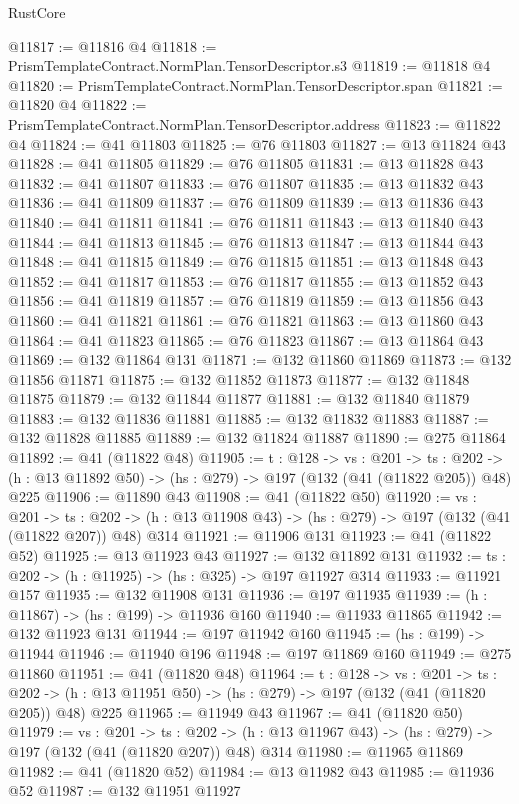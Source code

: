 \begin{lexlean}{RustCore}
\begin{coremodule}
@11817 := @11816 @4
@11818 := PrismTemplateContract.NormPlan.TensorDescriptor.s3
@11819 := @11818 @4
@11820 := PrismTemplateContract.NormPlan.TensorDescriptor.span
@11821 := @11820 @4
@11822 := PrismTemplateContract.NormPlan.TensorDescriptor.address
@11823 := @11822 @4
@11824 := @41 @11803
@11825 := @76 @11803
@11827 := @13 @11824 @43
@11828 := @41 @11805
@11829 := @76 @11805
@11831 := @13 @11828 @43
@11832 := @41 @11807
@11833 := @76 @11807
@11835 := @13 @11832 @43
@11836 := @41 @11809
@11837 := @76 @11809
@11839 := @13 @11836 @43
@11840 := @41 @11811
@11841 := @76 @11811
@11843 := @13 @11840 @43
@11844 := @41 @11813
@11845 := @76 @11813
@11847 := @13 @11844 @43
@11848 := @41 @11815
@11849 := @76 @11815
@11851 := @13 @11848 @43
@11852 := @41 @11817
@11853 := @76 @11817
@11855 := @13 @11852 @43
@11856 := @41 @11819
@11857 := @76 @11819
@11859 := @13 @11856 @43
@11860 := @41 @11821
@11861 := @76 @11821
@11863 := @13 @11860 @43
@11864 := @41 @11823
@11865 := @76 @11823
@11867 := @13 @11864 @43
@11869 := @132 @11864 @131
@11871 := @132 @11860 @11869
@11873 := @132 @11856 @11871
@11875 := @132 @11852 @11873
@11877 := @132 @11848 @11875
@11879 := @132 @11844 @11877
@11881 := @132 @11840 @11879
@11883 := @132 @11836 @11881
@11885 := @132 @11832 @11883
@11887 := @132 @11828 @11885
@11889 := @132 @11824 @11887
@11890 := @275 @11864
@11892 := @41 (@11822 @48)
@11905 := {t : @128} ->
  {vs : @201} ->
  {ts : @202} -> (h : @13 @11892 @50) -> (hs : @279) -> @197 (@132 (@41 (@11822 @205)) @48) @225
@11906 := @11890 @43
@11908 := @41 (@11822 @50)
@11920 := {vs : @201} ->
  {ts : @202} -> (h : @13 @11908 @43) -> (hs : @279) -> @197 (@132 (@41 (@11822 @207)) @48) @314
@11921 := @11906 @131
@11923 := @41 (@11822 @52)
@11925 := @13 @11923 @43
@11927 := @132 @11892 @131
@11932 := {ts : @202} -> (h : @11925) -> (hs : @325) -> @197 @11927 @314
@11933 := @11921 @157
@11935 := @132 @11908 @131
@11936 := @197 @11935
@11939 := (h : @11867) -> (hs : @199) -> @11936 @160
@11940 := @11933 @11865
@11942 := @132 @11923 @131
@11944 := @197 @11942 @160
@11945 := (hs : @199) -> @11944
@11946 := @11940 @196
@11948 := @197 @11869 @160
@11949 := @275 @11860
@11951 := @41 (@11820 @48)
@11964 := {t : @128} ->
  {vs : @201} ->
  {ts : @202} -> (h : @13 @11951 @50) -> (hs : @279) -> @197 (@132 (@41 (@11820 @205)) @48) @225
@11965 := @11949 @43
@11967 := @41 (@11820 @50)
@11979 := {vs : @201} ->
  {ts : @202} -> (h : @13 @11967 @43) -> (hs : @279) -> @197 (@132 (@41 (@11820 @207)) @48) @314
@11980 := @11965 @11869
@11982 := @41 (@11820 @52)
@11984 := @13 @11982 @43
@11985 := @11936 @52
@11987 := @132 @11951 @11927

\end{coremodule}
\end{lexlean}
